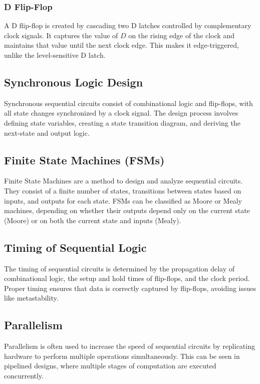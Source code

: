 \documentclass{article}
\begin{document}
\subsubsection{D Flip-Flop}
A D flip-flop is created by cascading two D latches controlled by complementary clock signals. It captures the value of $D$ on the rising edge of the clock and maintains that value until the next clock edge. This makes it edge-triggered, unlike the level-sensitive D latch.

\subsection{Synchronous Logic Design}
Synchronous sequential circuits consist of combinational logic and flip-flops, with all state changes synchronized by a clock signal. The design process involves defining state variables, creating a state transition diagram, and deriving the next-state and output logic.

\subsection{Finite State Machines (FSMs)}
Finite State Machines are a method to design and analyze sequential circuits. They consist of a finite number of states, transitions between states based on inputs, and outputs for each state. FSMs can be classified as Moore or Mealy machines, depending on whether their outputs depend only on the current state (Moore) or on both the current state and inputs (Mealy).

\subsection{Timing of Sequential Logic}
The timing of sequential circuits is determined by the propagation delay of combinational logic, the setup and hold times of flip-flops, and the clock period. Proper timing ensures that data is correctly captured by flip-flops, avoiding issues like metastability.

\subsection{Parallelism}
Parallelism is often used to increase the speed of sequential circuits by replicating hardware to perform multiple operations simultaneously. This can be seen in pipelined designs, where multiple stages of computation are executed concurrently.
\end{document}
